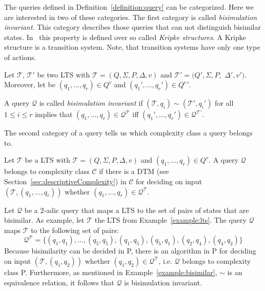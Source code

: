 The queries defined in Definition~\ref{definition:query} can be categorized. Here we are interested in two of these
categories. The first category is called \textit{bisimulation invariant}. This category describes those queries that
can not distinguish bisimilar states. In~\cite{otto1999bisimulation} this property is defined over so called
\textit{Kripke structures}. A Kripke structure is a transition system. Note, that transition systems have only one
type of actions.

\begin{definition}
    \label{definition:bisimulationInvariant}
    Let $\mathcal{T}$, $\mathcal{T}'$ be two LTS with $\mathcal{T} = (Q, \Sigma, P, \Delta, v)$
    and $\mathcal{T}' = (Q', \Sigma, P,$ $ \Delta', v')$. Moreover, let be $(q_1, \dots, q_r) \in Q^r$ and $({q_1}',
    \dots, {q_r}') \in {Q^r}'$.

    A query $\mathcal{Q}$ is called \emph{bisimulation invariant} if $(\mathcal{T}, q_i) \sim (\mathcal{T}', q_i')$
    for all $1 \leq i \leq r$ implies that $(q_1, \dots, q_r) \in \mathcal{Q}^\mathcal{T}$ iff $({q_1}',
    \dots, {q_r}') \in \mathcal{Q}^{{\mathcal{T}}'}$.
\end{definition}

The second category of a query tells us which complexity class a query belongs to.

\begin{definition}
    \label{definition:queryBelongsToComplexityClass}
    Let $\mathcal{T}$ be a LTS with $\mathcal{T} = (Q, \Sigma, P, \Delta, v)$ and $(q_1, \dots, q_{r}) \in Q^r$.
    A query $\mathcal{Q}$ belongs to complexity class $\mathcal{C}$ if there is a DTM (see
    Section~\ref{sec:descriptiveComplexity}) in $\mathcal{C}$ for deciding on input $(\mathcal{T}, (q_1, \dots,
    q_{r}))$ whether $(q_1, \dots, q_{r}) \in \mathcal{Q}^\mathcal{T}$.
\end{definition}

\begin{example}{\cite{lange2014capturing}}
    \label{example:query_bisimulation}
    Let $\mathcal{Q}$ be a $2$-adic query that maps a LTS to the set of pairs of states that are bisimilar. As
    example, let $\mathcal{T}$ the LTS from Example~\ref{example:lts}. The query $\mathcal{Q}$ maps $\mathcal{T}$ to
    the following set of pairs:
    \[\mathcal{Q}^\mathcal{T} = \{(q_1, q_1), \dots, (q_5, q_5), (q_1, q_5), (q_5, q_1), (q_2, q_4), (q_4,
    q_2)\}\]
    Because bisimilarity can be decided in P, there is an algorithm in P for deciding on input $(\mathcal{T}, (q_1,
    q_2))$ whether $(q_1, q_2) \in \mathcal{Q}^\mathcal{T}$, i.e. $\mathcal{Q}$ belongs to complexity class P.
    Furthermore, as mentioned in Example~\ref{example:bisimilar}, $\sim$ is an
    equivalence relation, it follows that $\mathcal{Q}$ is bisimulation invariant.
\end{example}

